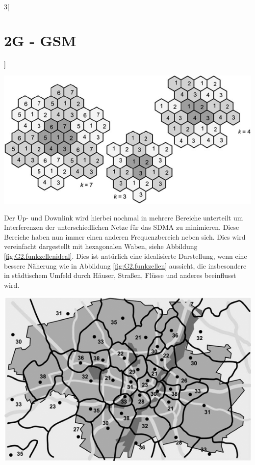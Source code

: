 \begin{multicols}{3}[\section{2G - GSM}]
\begin{Figure}
\includegraphics[width=\linewidth]{Kapitel/G2/Grafiken/GSM-Funkzellenideal.png}
\label{fig:G2.funkzellenideal}
\end{Figure}
Der Up- und Downlink wird hierbei nochmal in mehrere Bereiche unterteilt um Interferenzen der unterschiedlichen Netze für das SDMA zu minimieren. Diese Bereiche haben nun immer einen anderen Frequenzbereich neben sich. Dies wird vereinfacht dargestellt mit hexagonalen Waben, siehe Abbildung \ref{fig:G2.funkzellenideal}. Dies ist natürlich eine idealisierte Darstellung, wenn eine bessere Näherung wie in Abbildung \ref{fig:G2.funkzellen} aussieht, die insbesondere in städtischem Umfeld durch Häuser, Straßen, Flüsse und anderes beeinflusst wird. \cite{G2.2}

\begin{Figure}
\includegraphics[width=\linewidth]{Kapitel/G2/Grafiken/GSM-Funkzellen.png}
\label{fig:G2.funkzellen}
\end{Figure}


\end{multicols}
